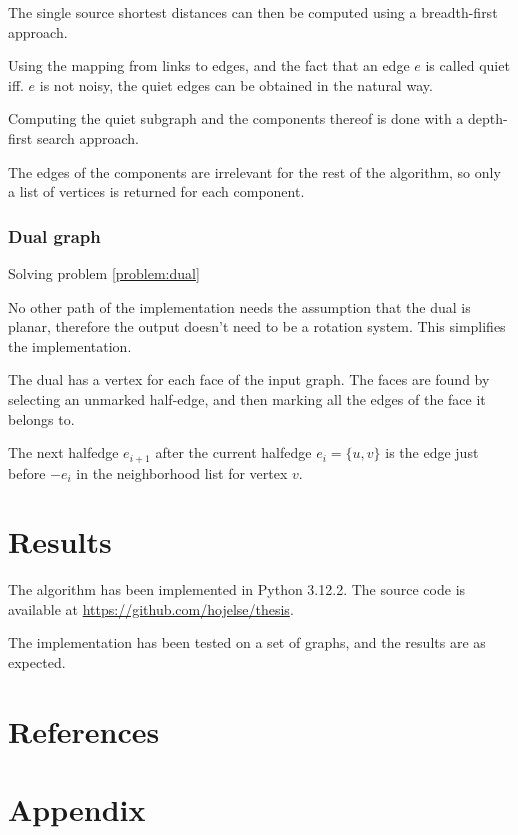 \documentclass{article}
\begin{document}
			The single source shortest distances can then be computed using a breadth-first approach.

			Using the mapping from links to edges, and the fact that an edge $e$ is called quiet iff. $e$ is not noisy, the quiet edges can be obtained in the natural way.

			Computing the quiet subgraph and the components thereof is done with a depth-first search approach.

			The edges of the components are irrelevant for the rest of the algorithm, so only a list of vertices is returned for each component.


		\subsubsection{Dual graph}\label{impl:dual}

			Solving problem \ref{problem:dual}

			No other path of the implementation needs the assumption that the dual is planar, therefore the output doesn't need to be a rotation system. This simplifies the implementation.

			The dual has a vertex for each face of the input graph. The faces are found by selecting an unmarked half-edge, and then marking all the edges of the face it belongs to.

			The next halfedge $e_{i+1}$ after the current halfedge $e_i = \{u, v\}$ is the edge just before $-e_i$ in the neighborhood list for vertex $v$.

\section{Results}

	The algorithm has been implemented in Python 3.12.2. The source code is available at \url{https://github.com/hojelse/thesis}.
	
	The implementation has been tested on a set of graphs, and the results are as expected. 


\newpage
\section{References}
	\printbibliography

\newpage
\section{Appendix}
\end{document}
